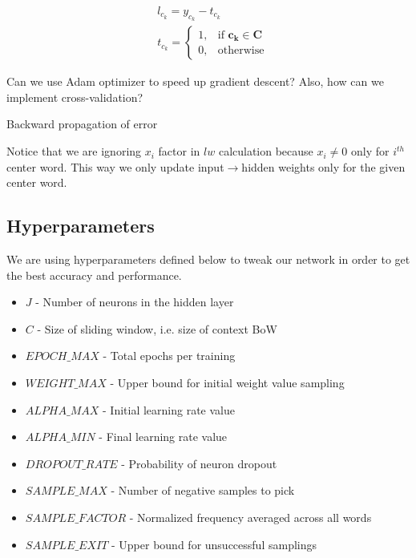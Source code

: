 \documentclass{article}
\newcommand{\SetAlgoStyle}{
	\SetAlgoNoLine
	\SetAlgoNoEnd
	\DontPrintSemicolon
}
\begin{document}
\begin{align}
	&l_{c_k} = y_{c_k} - t_{c_k} \\
	&t_{c_k} =
	\begin{cases}
		1, &\text{if } \boldsymbol{c_k} \in \boldsymbol{C} \\
		0, &\text{otherwise}
	\end{cases}
\end{align}

Can we use Adam optimizer to speed up gradient descent?
Also, how can we implement cross-validation?

\begin{algorithm}[H]
	\caption{Backward propagation of error}
	\SetAlgoStyle
\end{algorithm}

Notice that we are ignoring $x_i$ factor in $lw$ calculation because $x_i
\neq 0$ only for $i^{th}$ center word. This way we only update
input$\rightarrow$hidden weights only for the given center word.

\subsection{Hyperparameters}

We are using hyperparameters defined below to tweak our network in order to get the best accuracy and performance.

\begin{itemize}
	\item $J$ - Number of neurons in the hidden layer
	\item $C$ - Size of sliding window, i.e. size of context BoW
	\item $EPOCH\_MAX$ - Total epochs per training
	\item $WEIGHT\_MAX$ - Upper bound for initial weight value sampling
	\item $ALPHA\_MAX$ - Initial learning rate value
	\item $ALPHA\_MIN$ - Final learning rate value
	\item $DROPOUT\_RATE$ - Probability of neuron dropout
	\item $SAMPLE\_MAX$ - Number of negative samples to pick
	\item $SAMPLE\_FACTOR$ - Normalized frequency averaged across all words
	\item $SAMPLE\_EXIT$ - Upper bound for unsuccessful samplings
\end{itemize}
\end{document}
